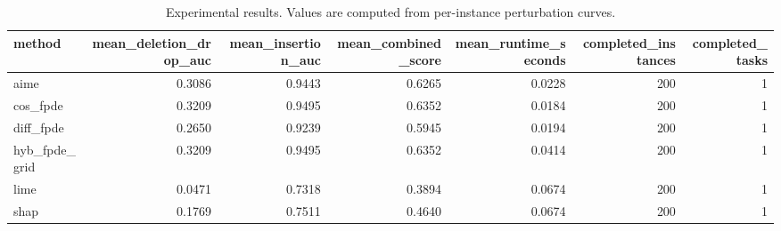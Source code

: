 \begin{table}[t]
\caption{Experimental results. Values are computed from per-instance perturbation curves.}
\label{tab:main_results_computed}
\centering
\begin{tabular}{lrrrrrr}
\toprule
method & mean\_deletion\_drop\_auc & mean\_insertion\_auc & mean\_combined\_score & mean\_runtime\_seconds & completed\_instances & completed\_tasks \\
\midrule
aime & 0.3086 & 0.9443 & 0.6265 & 0.0228 & 200 & 1 \\
cos\_fpde & 0.3209 & 0.9495 & 0.6352 & 0.0184 & 200 & 1 \\
diff\_fpde & 0.2650 & 0.9239 & 0.5945 & 0.0194 & 200 & 1 \\
hyb\_fpde\_grid & 0.3209 & 0.9495 & 0.6352 & 0.0414 & 200 & 1 \\
lime & 0.0471 & 0.7318 & 0.3894 & 0.0674 & 200 & 1 \\
shap & 0.1769 & 0.7511 & 0.4640 & 0.0674 & 200 & 1 \\
\bottomrule
\end{tabular}

\end{table}
